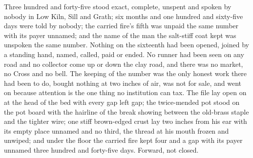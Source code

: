 Three hundred and forty-five stood exact, complete, unspent and spoken by nobody in Low Kiln, Sill and Grath; six months and one hundred and sixty-five days were told by nobody; the carried fire's fifth was unpaid the same number with its payer unnamed; and the name of the man the salt-stiff coat kept was unspoken the same number. Nothing on the sixteenth had been opened, joined by a standing hand, named, called, paid or ended. No runner had been seen on any road and no collector come up or down the clay road, and there was no market, no Cross and no bell. The keeping of the number was the only honest work there had been to do, bought nothing at two inches of air, was not for sale, and went on because attention is the one thing no institution can tax. The file lay open on  at the head of the bed with every gap left gap; the twice-mended pot stood on the pot board with the hairline of the break showing between the old-brass staple and the tighter wire; one stiff brown-edged crust lay two inches from his ear with its empty place unnamed and no third, the thread at his mouth frozen and unwiped; and under the floor the carried fire kept four and a gap with its payer unnamed three hundred and forty-five days. Forward, not closed.
